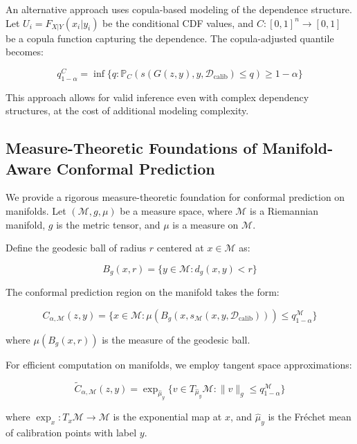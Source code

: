 \documentclass{article}
\theoremstyle{plain}
\theoremstyle{definition}
\theoremstyle{remark}
\begin{document}
An alternative approach uses copula-based modeling of the dependence structure. Let $U_i = F_{X|Y}(x_i | y_i)$ be the conditional CDF values, and $C:[0,1]^n \rightarrow [0,1]$ be a copula function capturing the dependence. The copula-adjusted quantile becomes:

\begin{equation}
q_{1-\alpha}^C = \inf\{q : \mathbb{P}_{C}(s(G(z, y), y, \mathcal{D}_{\text{calib}}) \leq q) \geq 1-\alpha\}
\end{equation}

This approach allows for valid inference even with complex dependency structures, at the cost of additional modeling complexity.

\subsection{Measure-Theoretic Foundations of Manifold-Aware Conformal Prediction}

We provide a rigorous measure-theoretic foundation for conformal prediction on manifolds. Let $(\mathcal{M}, g, \mu)$ be a measure space, where $\mathcal{M}$ is a Riemannian manifold, $g$ is the metric tensor, and $\mu$ is a measure on $\mathcal{M}$.

Define the geodesic ball of radius $r$ centered at $x \in \mathcal{M}$ as:

\begin{equation}
B_g(x, r) = \{y \in \mathcal{M} : d_g(x, y) < r\}
\end{equation}

The conformal prediction region on the manifold takes the form:

\begin{equation}
C_{\alpha, \mathcal{M}}(z, y) = \{x \in \mathcal{M} : \mu(B_g(x, s_{\mathcal{M}}(x, y, \mathcal{D}_{\text{calib}}))) \leq q_{1-\alpha}^{\mathcal{M}}\}
\end{equation}

where $\mu(B_g(x, r))$ is the measure of the geodesic ball.

For efficient computation on manifolds, we employ tangent space approximations:

\begin{equation}
\tilde{C}_{\alpha, \mathcal{M}}(z, y) = \exp_{\hat{\mu}_y}\{v \in T_{\hat{\mu}_y}\mathcal{M} : \|v\|_g \leq q_{1-\alpha}^{\mathcal{M}}\}
\end{equation}

where $\exp_x: T_x\mathcal{M} \rightarrow \mathcal{M}$ is the exponential map at $x$, and $\hat{\mu}_y$ is the Fréchet mean of calibration points with label $y$.
\end{document}
